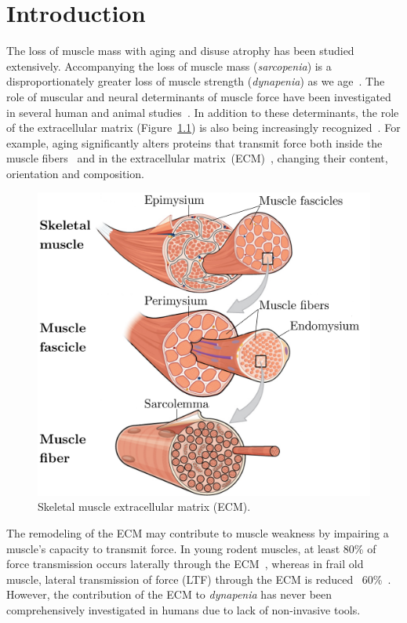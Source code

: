 \chapter{Introduction}
The loss of muscle mass with aging and disuse atrophy has been studied extensively. 
Accompanying the loss of muscle mass (\textit{sarcopenia}) is a disproportionately greater loss of muscle strength (\textit{dynapenia}) as we age~\cite{RNIGoodpaster}. 
The role of muscular and neural determinants of muscle force have been investigated in several human and animal studies~\cite{RNIBallak}.
In addition to these determinants, the role of the extracellular matrix (Figure~\ref{fig: ECM}) is also being increasingly recognized~\cite{RNIRamaswamy, RNIZhang}. 
For example, aging significantly alters proteins that transmit force both inside the muscle fibers~\cite{RNIHughes} and in the extracellular matrix~(ECM)~\cite{RNIKragstrup}, changing their content, orientation and composition. 
\begin{figure}[!ht]
\centering
\includegraphics[scale=.4]{Figures/FIBER.pdf}
\caption[Skeletal muscle extracellular matrix]{Skeletal muscle extracellular matrix (ECM).}
\label{fig: ECM}
\end{figure}
The remodeling of the ECM may contribute to muscle weakness by impairing a muscle's capacity to transmit force. 
In young rodent muscles, at least 80\% of force transmission occurs laterally through the ECM~\cite{RNIHuijing}, whereas in frail old muscle, lateral transmission of force (LTF) through the ECM is reduced ~60\%~\cite{RNIRamaswamy, RNIZhang}. 
However, the contribution of the ECM to \textit{dynapenia} has never been comprehensively investigated in humans due to lack of non-invasive tools.

